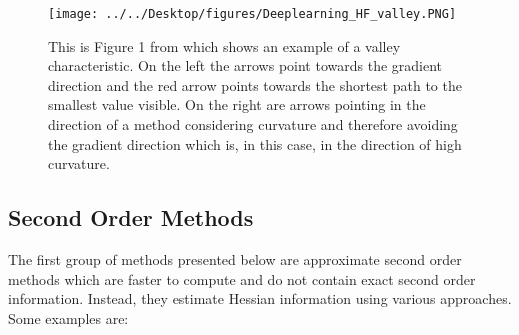 \documentclass[letterpaper,12pt,titlepage,oneside,final]{book}
\begin{document}
	\begin{figure}[h]
		\centering
		\texttt{[image: ../../Desktop/figures/Deeplearning\_HF\_valley.PNG]}
		\caption{This is Figure 1 from \cite{martens2010deep} which shows an example of a valley characteristic. On the left the arrows point towards the gradient direction and the red arrow points towards the shortest path to the smallest value visible. On the right are arrows pointing in the direction of a method considering curvature and therefore avoiding the gradient direction which is, in this case, in the direction of high curvature.}
		\label{figure:valley}
	\end{figure}
	
	\subsection{Second Order Methods} \label{section:second_order}
	
	The first group of methods presented below are approximate second order methods which are faster to compute and do not contain exact second order information. Instead, they estimate Hessian information using various approaches. Some examples are:
	
\end{document}
